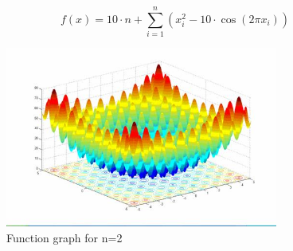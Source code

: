 \documentclass{article}
\begin{document}
{\Large %
\[
f(x) = 10 \cdot n + \sum_{i=1}^{n} \left( x_i^2 -10 \cdot \cos(2\pi x_i) \right)
\]

\begin{figure}[h]
    \centering
    \includegraphics[width=0.8\textwidth]{rastringin.jpg} 
    \caption{Function graph for n=2 \cite{Rastrigin}}
    \label{fig:rastrigin-image}
\end{figure}

}
\end{document}
